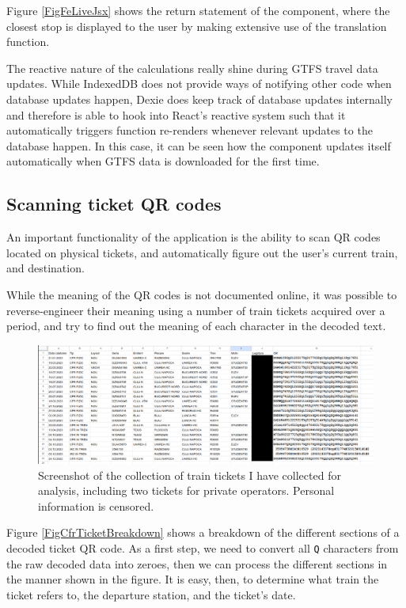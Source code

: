 Figure \ref{FigFeLiveJsx} shows the return statement of the component, where the closest stop is displayed to the user by making extensive use of the translation function.

The reactive nature of the calculations really shine during GTFS travel data updates. While IndexedDB does not provide ways of notifying other code when data\-base updates happen, Dexie does keep track of database updates internally and therefore is able to hook into React's reactive system such that it automatically triggers function re-renders whenever relevant updates to the database happen. In this case, it can be seen how the component updates itself automatically when GTFS data is downloaded for the first time.

\subsection{Scanning ticket QR codes}
An important functionality of the application is the ability to scan QR codes located on physical tickets, and automatically figure out the user's current train, and destination.

While the meaning of the QR codes is not documented online, it was possible to reverse-engineer their meaning using a number of train tickets acquired over a period, and try to find out the meaning of each character in the decoded text.

\begin{figure}[htbp]
    \centering
    \includegraphics[width=1\textwidth]{./figures/ch4_cfr-tickets.png}
    \caption{Screenshot of the collection of train tickets I have collected for analysis, including two tickets for private operators. Personal information is censored.}
    \label{FigCfrTickets}
\end{figure}

Figure \ref{FigCfrTicketBreakdown} shows a breakdown of the different sections of a decoded ticket QR code. As a first step, we need to convert all \verb|Q| characters from the raw decoded data into zeroes, then we can process the different sections in the manner shown in the figure. It is easy, then, to determine what train the ticket refers to, the departure station, and the ticket's date.

